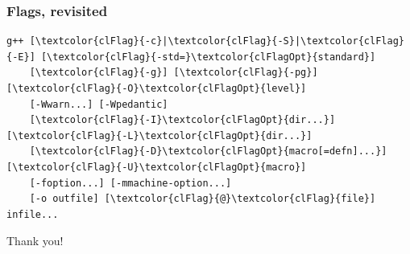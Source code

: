 \documentclass{beamer}
\begin{document}
\begin{frame}[fragile]
\frametitle{Flags, revisited}

\centering
\begin{BVerbatim}[commandchars=\\\{\}]
g++ [\textcolor{clFlag}{-c}|\textcolor{clFlag}{-S}|\textcolor{clFlag}{-E}] [\textcolor{clFlag}{-std=}\textcolor{clFlagOpt}{standard}]
    [\textcolor{clFlag}{-g}] [\textcolor{clFlag}{-pg}] [\textcolor{clFlag}{-O}\textcolor{clFlagOpt}{level}]
    [-Wwarn...] [-Wpedantic]
    [\textcolor{clFlag}{-I}\textcolor{clFlagOpt}{dir...}] [\textcolor{clFlag}{-L}\textcolor{clFlagOpt}{dir...}]
    [\textcolor{clFlag}{-D}\textcolor{clFlagOpt}{macro[=defn]...}] [\textcolor{clFlag}{-U}\textcolor{clFlagOpt}{macro}]
    [-foption...] [-mmachine-option...]
    [-o outfile] [\textcolor{clFlag}{@}\textcolor{clFlag}{file}] infile...
\end{BVerbatim}

\vspace{4.5ex}
\begin{center}
{\huge Thank you!}
\end{center}
\end{frame}
\end{document}
